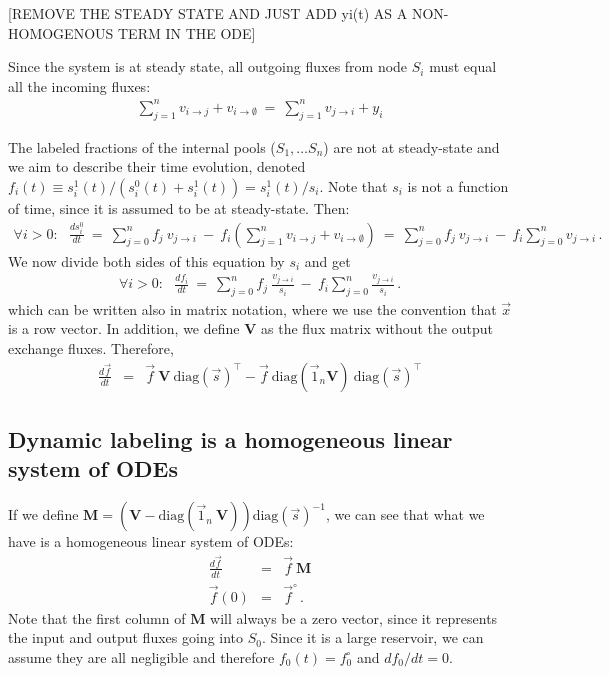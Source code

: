 \documentclass{article}
\newcommand{\finit}{\ensuremath{\vec{f}^\circ}}
\newcommand{\flux}[2]{\ensuremath{v_{{#1} \rightarrow {#2}}}}
\begin{document}
[REMOVE THE STEADY STATE AND JUST ADD yi(t) AS A NON-HOMOGENOUS TERM IN THE ODE]

Since the system is at steady state, all outgoing fluxes from node $S_i$ must equal all the incoming fluxes:
\begin{eqnarray}
	\sum_{j=1}^{n} \flux{i}{j} + \flux{i}{\emptyset} ~=~ \sum_{j=1}^{n} \flux{j}{i} + y_i
\end{eqnarray}

The labeled fractions of the internal pools ($S_1, \ldots S_n$) are not at steady-state and we aim to describe their time evolution, denoted $f_i(t) \equiv s_i^1(t) / (s_i^0(t) + s_i^1(t)) = s_i^1(t) / s_i$. Note that $s_i$ is not a function of time, since it is assumed to be at steady-state. Then:
\begin{eqnarray}
    \forall i > 0: ~~~ \frac{d s_i^0}{dt}
    ~=~
    \sum_{j=0}^{n} f_j~\flux{j}{i} ~-~ f_i \left( \sum_{j=1}^n \flux{i}{j} + \flux{i}{\emptyset} \right)
    ~=~
    \sum_{j=0}^{n} f_j~\flux{j}{i} ~-~ f_i \sum_{j=0}^{n} \flux{j}{i}\,.
\end{eqnarray}
We now divide both sides of this equation by $s_i$ and get
\begin{eqnarray}
\forall i > 0: ~~~ \frac{d f_i}{dt}
~=~
\sum_{j=0}^{n} f_j~\frac{\flux{j}{i}}{s_i} ~-~ f_i \sum_{j=0}^{n} \frac{\flux{j}{i}}{s_i} 
\,.\label{eq:steady_state}
\end{eqnarray}
which can be written also in matrix notation, where we use the convention that $\vec{x}$ is a row vector. In addition, we define $\mathbf{V}$ as the flux matrix without the output exchange fluxes. Therefore,
\begin{eqnarray}
	\frac{d\vec{f}}{dt} 
	&=& \vec{f}~\mathbf{V}~\text{diag}(\vec{s})^\top - \vec{f}~\text{diag}(\vec{1}_n \mathbf{V})~\text{diag}(\vec{s})^\top
\end{eqnarray}

\subsection{Dynamic labeling is a homogeneous linear system of ODEs}
If we define $\mathbf{M} = \left(\mathbf{V} - \text{diag}(\vec{1}_n~\mathbf{V})\right) \text{diag}(\vec{s})^{-1}$, we can see that what we have is a homogeneous linear system of ODEs:
\begin{eqnarray}\label{eq:homogenous}
    \frac{d\vec{f}}{d t} &=& \vec{f}~\mathbf{M} \\
    \vec{f}(0) &=& \finit\,.
\end{eqnarray}
Note that the first column of $\mathbf{M}$ will always be a zero vector, since it represents the input and output fluxes going into $S_0$. Since it is a large reservoir, we can assume they are all negligible and therefore $f_0(t) = f^\circ_0$ and $df_0 / dt = 0$.
\end{document}
